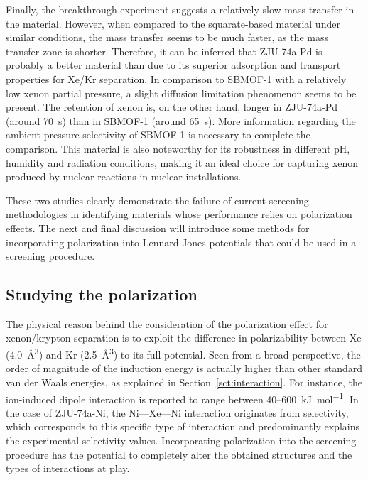 \documentclass[main]{subfiles}
\begin{document}
Finally, the breakthrough experiment suggests a relatively slow mass transfer in the material. However, when compared to the squarate-based material under similar conditions, the mass transfer seems to be much faster, as the mass transfer zone is shorter. Therefore, it can be inferred that ZJU-74a-Pd is probably a better material than  due to its superior adsorption and transport properties for Xe/Kr separation. In comparison to SBMOF-1 with a relatively low xenon partial pressure, a slight diffusion limitation phenomenon seems to be present. The retention of xenon is, on the other hand, longer in ZJU-74a-Pd (around \SI{70}{\s}) than in SBMOF-1 (around \SI{65}{\s}). More information regarding the ambient-pressure selectivity of SBMOF-1 is necessary to complete the comparison.
This material is also noteworthy for its robustness in different pH, humidity and radiation conditions, making it an ideal choice for capturing xenon produced by nuclear reactions in nuclear installations.

These two studies clearly demonstrate the failure of current screening methodologies in identifying materials whose performance relies on polarization effects. The next and final discussion will introduce some methods for incorporating polarization into Lennard-Jones potentials that could be used in a screening procedure.

\subsection{Studying the polarization}

The physical reason behind the consideration of the polarization effect for xenon/krypton separation is to exploit the difference in polarizability between Xe (\SI{4.0}{\cubic\angstrom}) and Kr (\SI{2.5}{\cubic\angstrom})\autocite{Olney1997} to its full potential. Seen from a broad perspective, the order of magnitude of the induction energy is actually higher than other standard van der Waals energies, as explained in Section~\ref{sct:interaction}. For instance, the ion-induced dipole interaction is reported to range between 40--600~\si{\kJ\per\mol}. In the case of ZJU-74a-Ni, the Ni---Xe---Ni interaction originates from selectivity, which corresponds to this specific type of interaction and predominantly explains the experimental selectivity values. Incorporating polarization into the screening procedure has the potential to completely alter the obtained structures and the types of interactions at play.
\end{document}
